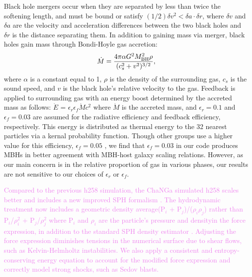 \documentclass[manuscript]{aastex}
\begin{document}
Black hole mergers occur when they are separated by less than twice the softening length, and must be bound or satisfy $(1/2) \delta v^2 < \delta a \cdot \delta r$,  where $\delta v$ and $\delta a$ are the velocity and acceleration differences between the two black holes and $\delta r$ is the distance separating them. In addition to gaining mass via merger, black holes gain mass through Bondi-Hoyle gas accretion:
\begin{equation}
\dot{M} = \frac{4 \pi \alpha G^2 M^{2}_{\rm BH} \rho}{(c^{2}_{s} + v^2)^{3/2}},
\end{equation}
where $\alpha$ is a constant equal to 1, $\rho$ is the density of the surrounding gas, $c_s$ is the sound speed, and $v$ is the black hole's relative velocity to the gas. Feedback is applied to surrounding gas with an energy boost determined by the accreted mass as follows: $\dot{E}$ = $\epsilon _{r}$$\epsilon_{f}$$\dot{M}$$c^2$ where $\dot{M}$ is the accreted mass, and $\epsilon _r = 0.1$ and $\epsilon _f = 0.03$ are assumed for the radiative efficiency and feedback efficiency, respectively. This energy is distributed as thermal energy to the 32 nearest particles via a kernal probability function. Though other groups use a higher value for this efficiency, $\epsilon _f = 0.05$ \citep{Sijacki2007,DiMatteo2008}, we find that $\epsilon_f = 0.03$ in our code produces MBHs in better agreement with MBH-host galaxy scaling relations. However, as our main concern is in the relative proportion of gas in various phases, our results are not sensitive to our choices of $\epsilon _{r}$ or $\epsilon_{f}$.

\textcolor{violet}{
Compared to the previous h258 simulation, the ChaNGa simulated h258 scales better and includes a new improved SPH formalism \citep{Keller2014}. The hydrodynamic treatment now includes a geometric density average\textemdash (P$_i$ + P$_j$)/($\rho_i \rho_j$) rather than P$_i$/$\rho_{i}^2$ + P$_j$/$\rho_{j}^2$ where P$_i$ and $\rho_i$ are the particle's pressure and density\textemdash in the force expression, in addition to the standard SPH density estimator \citep{Ritchie2001}. Adjusting the force expression diminishes tensions in the numerical surface due to shear flows, such as Kelvin-Helmholtz instabilities. We also apply a consistent and entropy-conserving energy equation to account for the modified force expression and correctly model strong shocks, such as Sedov blasts. 
}


\end{document}
